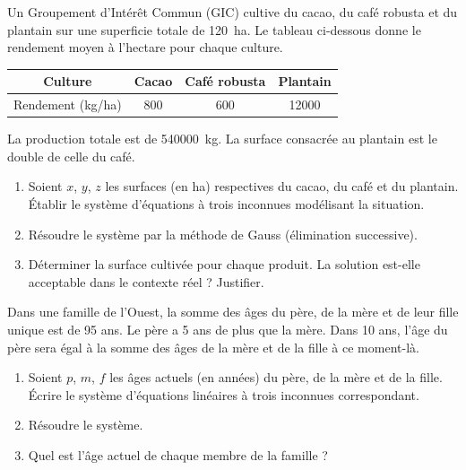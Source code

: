 \documentclass[11pt]{article}
\begin{document}
\begin{exercice}
Un Groupement d'Intérêt Commun (GIC) cultive du cacao, du café robusta et du plantain sur une superficie totale de \SI{120}{ha}. Le tableau ci-dessous donne le rendement moyen à l'hectare pour chaque culture.

\begin{center}
\begin{tabular}{|c|c|c|c|}
\hline
Culture & Cacao & Café robusta & Plantain \\ \hline
Rendement (kg/ha) & 800 & 600 & 12000 \\ \hline
\end{tabular}
\end{center}

La production totale est de \SI{540000}{kg}. La surface consacrée au plantain est le double de celle du café.
\begin{enumerate}
    \item Soient $x$, $y$, $z$ les surfaces (en ha) respectives du cacao, du café et du plantain. Établir le système d'équations à trois inconnues modélisant la situation.
    \item Résoudre le système par la méthode de Gauss (élimination successive).
    \item Déterminer la surface cultivée pour chaque produit. La solution est-elle acceptable dans le contexte réel ? Justifier.
\end{enumerate}
\end{exercice}

\begin{exercice}
Dans une famille de l'Ouest, la somme des âges du père, de la mère et de leur fille unique est de 95 ans. Le père a 5 ans de plus que la mère. Dans 10 ans, l'âge du père sera égal à la somme des âges de la mère et de la fille à ce moment-là.
\begin{enumerate}
    \item Soient $p$, $m$, $f$ les âges actuels (en années) du père, de la mère et de la fille. Écrire le système d'équations linéaires à trois inconnues correspondant.
    \item Résoudre le système.
    \item Quel est l'âge actuel de chaque membre de la famille ?
\end{enumerate}
\end{exercice}
\end{document}
